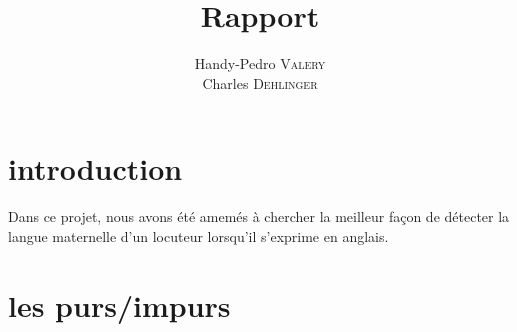 \documentclass[a4paper]{article}
\title{Rapport}
\author{ Handy-Pedro \textsc{Valery}\\
  Charles \textsc{Dehlinger}\\
}
\begin{document}
\maketitle

\tableofcontents

\section{introduction}
Dans ce projet, nous avons été amemés à chercher la meilleur façon de
détecter la langue maternelle d'un locuteur lorsqu'il s'exprime en
anglais. 

\section{les purs/impurs}
\end{document}
